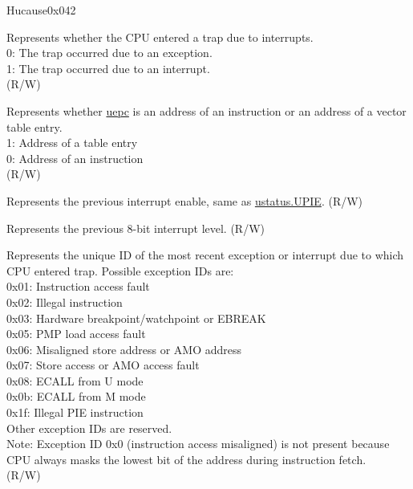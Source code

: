 \begin{register}{H}{ucause}{0x042}\label{regdesc:UCAUSE}
%
%
%
%
%
%
%
%
\regnewline%
\begin{regdesc}\begin{reglist}
\label{fielddesc:UCAUSEINT} \item [INT] Represents whether the CPU entered a trap due to interrupts. \\
0: The trap occurred due to an exception.\\
1: The trap occurred due to an interrupt.\\
(R/W)
\label{fielddesc:UCAUSE_UINHV}\item [UINHV] Represents whether \hyperref[fielddesc:UEPC]{uepc} is an address of an instruction or an address of a vector table entry.\\
1: Address of a table entry\\
0: Address of an instruction\\
(R/W)
\label{fielddesc:UCAUSE_UPIE}\item [UPIE] Represents the previous interrupt enable, same as \hyperref[fielddesc:USTATUSUPIE]{ustatus.UPIE}.  (R/W)
\label{fielddesc:UCAUSE_UPIL}\item [UPIL] Represents the previous 8-bit interrupt level. (R/W)
\label{fielddesc:UCAUSECODE}\item [CODE] Represents the unique ID of the most recent exception or interrupt due to which CPU entered trap. Possible exception IDs are:\\
0x01: Instruction access fault\\
0x02: Illegal instruction\\
0x03: Hardware breakpoint/watchpoint or EBREAK\\
0x05: PMP load access fault\\
0x06: Misaligned store address or AMO address\\
0x07: Store access or AMO access fault\\
0x08: ECALL from U mode\\
0x0b: ECALL from M mode\\
0x1f: Illegal PIE instruction\\
Other exception IDs are reserved.\\
Note: Exception ID 0x0 (instruction access misaligned) is not present because CPU always masks the lowest bit of the address during instruction fetch.\\
(R/W)
\end{reglist}\end{regdesc}
\end{register}

